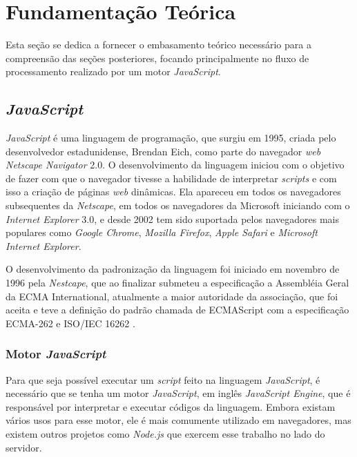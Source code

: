 \chapter{Fundamentação Teórica}
\label{cap:fundamentacao-teorica}

Esta seção se dedica a fornecer o embasamento teórico necessário para a compreensão das
seções posteriores, focando principalmente no fluxo de processamento realizado por um
motor \textit{JavaScript}.

\section{\textit{JavaScript}}
\label{sec:javascript}

\textit{JavaScript} é uma linguagem de programação, que surgiu em 1995, criada pelo
desenvolvedor estadunidense, Brendan Eich, como parte do navegador
\textit{web Netscape Navigator} 2.0. O desenvolvimento da linguagem iniciou com o objetivo
de fazer com que o navegador tivesse a habilidade de interpretar \textit{scripts} e com
isso a criação de páginas \textit{web} dinâmicas. Ela apareceu em todos os navegadores
subsequentes da \textit{Netscape}, em todos os navegadores da Microsoft iniciando com o
\textit{Internet Explorer} 3.0, e desde 2002 tem sido suportada pelos navegadores mais
populares como \textit{Google Chrome}, \textit{Mozilla Firefox}, \textit{Apple Safari} e
\textit{Microsoft Internet Explorer}. \cite{w3cbs}

O desenvolvimento da padronização da linguagem foi iniciado em novembro de 1996 pela
\textit{Nestcape}, que ao finalizar submeteu a especificação a Assembléia Geral da ECMA
International, atualmente a maior autoridade da associação, que foi aceita e teve a
definição do padrão chamada de ECMAScript com a especificação ECMA-262 e ISO/IEC 16262
\cite{ecmascript}.

\subsection{Motor \textit{JavaScript}}
\label{ssec:jsengine}

Para que seja possível executar um \textit{script} feito na linguagem \textit{JavaScript},
é necessário que se tenha um motor \textit{JavaScript}, em inglês
\textit{JavaScript Engine}, que é responsável por interpretar e executar códigos da
linguagem. Embora existam vários usos para esse motor, ele é mais comumente utilizado em
navegadores, mas existem outros projetos como \textit{Node.js} que exercem esse trabalho
no lado do servidor.

